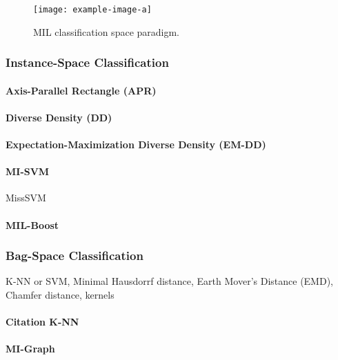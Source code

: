 \begin{center}
	\begin{figure*}[h]
		\centering
		\texttt{[image: example-image-a]}
		\caption[MIL classification space paradigm.]{MIL classification space paradigm.}
		\label{fig:mil_classification_space_paradigm}
	\end{figure*}
\end{center}

\subsubsection{Instance-Space Classification}

\paragraph{Axis-Parallel Rectangle (APR)}

\paragraph{Diverse Density (DD)}

\paragraph{Expectation-Maximization Diverse Density (EM-DD)}

\paragraph{MI-SVM}

MissSVM


\paragraph{MIL-Boost}

\subsubsection{Bag-Space Classification}

K-NN or SVM, Minimal Hausdorrf distance, Earth Mover's Distance (EMD), Chamfer distance, kernels

\paragraph{Citation K-NN}

\paragraph{MI-Graph}

